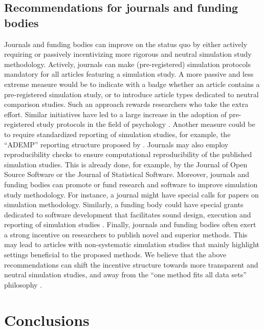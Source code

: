 \documentclass[a4paper, 11pt]{article}
\begin{document}
\subsection{Recommendations for journals and funding bodies}
Journals and funding bodies can improve on the status quo by either actively
requiring or passively incentivizing more rigorous and neutral simulation study
methodology. Actively, journals can make (pre-registered) simulation protocols
mandatory for all articles featuring a simulation study. A more passive and less
extreme measure would be to indicate with a badge whether an article contains a
pre-registered simulation study, or to introduce article types dedicated to
neutral comparison studies. Such an approach rewards researchers who take the
extra effort. Similar initiatives have led to a large increase in the adoption
of pre-registered study protocols in the field of psychology
\citep{Kidwell2016}. Another measure could be to require standardized reporting
of simulation studies, for example, the ``ADEMP'' reporting structure proposed
by \citet{Morris2019}. Journals may also employ reproducibility checks to ensure
computational reproducibility of the published simulation studies. This is
already done, for example, by the Journal of Open Source Software or the Journal
of Statistical Software. Moreover, journals and funding bodies can promote or
fund research and software to improve simulation study methodology. For
instance, a journal might have special calls for papers on simulation
methodology. Similarly, a funding body could have special grants dedicated to
software development that facilitates sound design, execution and reporting of
simulation studies \citep[as][]{White2010, Gasparini2018, Chalmers2020}.
Finally, journals and funding bodies often exert a strong incentive on
researchers to publish novel and superior methods. This may lead to articles
with non-systematic simulation studies that mainly highlight settings beneficial
to the proposed methods. We believe that the above recommendations can shift the
incentive structure towards more transparent and neutral simulation studies, and
away from the ``one method fits all data sets'' philosophy \citep{Strobl2022}.

\section{Conclusions} \label{sec:discussion}
\end{document}
